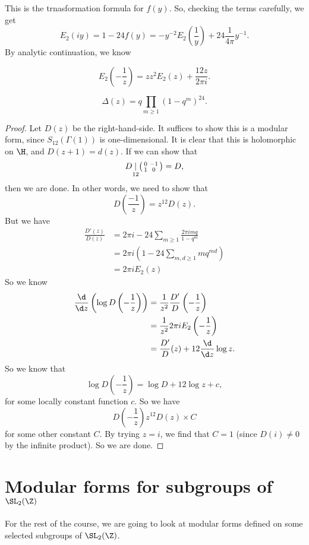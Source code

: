 \documentclass[a4paper]{article}
\begin{document}
This is the trnasformation formula for $f(y)$. So, checking the terms carefully, we get
\[
  E_2 (iy) = 1 - 24 f(y) = - y^{-2} E_2\left(\frac{1}{y}\right) + 24 \frac{1}{4\pi} y^{-1}.
\]
By analytic continuation, we know
\begin{thm}
  \[
    E_2 \left(-\frac{1}{z}\right) = zz^2 E_2(z) + \frac{12z}{2\pi i}.
  \]
\end{thm}

\begin{cor}
  \[
    \Delta(z) = q \prod_{m \geq 1} (1 - q^m)^{24}.
  \]
\end{cor}

\begin{proof}
  Let $D(z)$ be the right-hand-side. It suffices to show this is a modular form, since $S_{12}(\Gamma(1))$ is one-dimensional. It is clear that this is holomorphic on $\H$, and $D(z + 1) = d(z)$. If we can show that
  \[
    D\underset{12}{|}
    \begin{psmallmatrix}
      0 & -1\\
      1 & 0
    \end{psmallmatrix} = D,
  \]
  then we are done. In other words, we need to show that
  \[
    D\left(\frac{-1}{z}\right) = z^{12}D(z).
  \]
  But we have
  \begin{align*}
    \frac{D'(z)}{D(z)} &= 2\pi i - 24 \sum_{m \geq 1} \frac{2\pi i m q}{1 - q^m} \\
    &= 2\pi i \left(1 - 24 \sum_{m, d\geq 1} m q^{md}\right)\\
    &= 2\pi i E_2(z)
  \end{align*}
  So we know
  \begin{align*}
    \frac{\d}{\d z}\left(\log D\left(-\frac{1}{z}\right)\right) &= \frac{1}{z^2} \frac{D'}{D}\left(-\frac{1}{z}\right) \\
    &= \frac{1}{z^2} 2\pi i E_2\left(-\frac{1}{z}\right)\\
    &= \frac{D'}{D}(z) + 12 \frac{\d}{\d z} \log z.
  \end{align*}
  So we know that
  \[
    \log D\left(-\frac{1}{z}\right) = \log D + 12 \log z + c,
  \]
  for some locally constant function $c$. So we have
  \[
    D\left(-\frac{1}{z}\right)z^{12}D(z) \times C
  \]
  for some other constant $C$. By trying $z = i$, we find that $C = 1$ (since $D(i) \not= 0$ by the infinite product). So we are done.
\end{proof}

\section{Modular forms for subgroups of \texorpdfstring{$\SL_2(\Z)$}{SL2(Z)}}
For the rest of the course, we are going to look at modular forms defined on some selected subgroups of $\SL_2(\Z)$.
\end{document}
